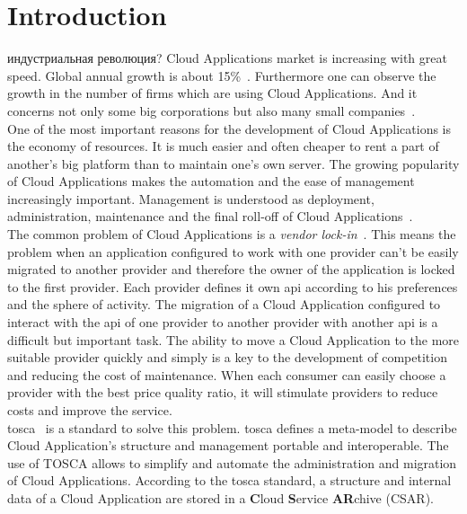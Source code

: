
\chapter{Introduction}
индустриальная революция?
\fi
Cloud Applications market is increasing with great speed. 
Global annual growth is about 15\%~\cite*{statista_global}.
Furthermore one can observe the growth in the number of firms which are using Cloud Applications. 
And it concerns not only some big corporations but also many small companies~\cite*{destatis_2014, destatis_2016}. \\ 
One of the most important reasons for the development of Cloud Applications is the economy of resources.
It is much easier and often cheaper to rent a part of another's big platform than to maintain one's own server.
The growing popularity of Cloud Applications makes the automation and the ease of management increasingly important.
Management is understood as deployment, administration, maintenance and the final roll-off of Cloud Applications~\cite*{autocloud}. \\   
The common problem of Cloud Applications is a \emph{vendor lock-in}~\cite*{lockin}. 
This means the problem when an application configured to work with one provider can't be easily migrated to another provider and therefore the owner of the application is locked to the first provider.
Each provider defines it own \gls{api} according to his preferences and the sphere of activity.
The migration of a Cloud Application configured to interact with the \gls{api} of one provider to another provider with another \gls{api} is a difficult but important task. 
The ability to move a Cloud Application to the more suitable provider quickly and simply is a key to the development of competition and reducing the cost of maintenance. 
When each consumer can easily choose a provider with the best price quality ratio, it will stimulate providers to reduce costs and improve the service.\\
\gls{tosca}~\cite*{TOSCA-v1.0} is a standard to solve this problem. 
\gls{tosca} defines a meta-model to describe Cloud Application's structure and management portable and interoperable. 
The use of TOSCA allows to simplify and automate the administration and migration of Cloud Applications. 
According to the \gls{tosca} standard, a structure and internal data of a Cloud Application are stored in a \textbf{C}loud \textbf{S}ervice \textbf{AR}chive (CSAR).
